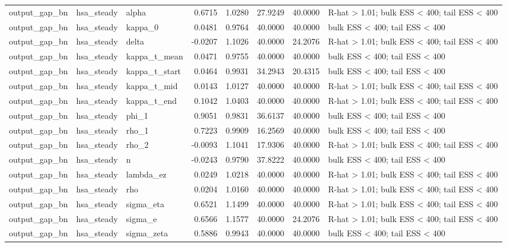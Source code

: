 \begin{tabular}{lllrrrrl}
output\_gap\_bn & hsa\_steady & alpha & 0.6715 & 1.0280 & 27.9249 & 40.0000 & R-hat > 1.01; bulk ESS < 400; tail ESS < 400 \\
output\_gap\_bn & hsa\_steady & kappa\_0 & 0.0481 & 0.9764 & 40.0000 & 40.0000 & bulk ESS < 400; tail ESS < 400 \\
output\_gap\_bn & hsa\_steady & delta & -0.0207 & 1.1026 & 40.0000 & 24.2076 & R-hat > 1.01; bulk ESS < 400; tail ESS < 400 \\
output\_gap\_bn & hsa\_steady & kappa\_t\_mean & 0.0471 & 0.9755 & 40.0000 & 40.0000 & bulk ESS < 400; tail ESS < 400 \\
output\_gap\_bn & hsa\_steady & kappa\_t\_start & 0.0464 & 0.9931 & 34.2943 & 20.4315 & bulk ESS < 400; tail ESS < 400 \\
output\_gap\_bn & hsa\_steady & kappa\_t\_mid & 0.0143 & 1.0127 & 40.0000 & 40.0000 & R-hat > 1.01; bulk ESS < 400; tail ESS < 400 \\
output\_gap\_bn & hsa\_steady & kappa\_t\_end & 0.1042 & 1.0403 & 40.0000 & 40.0000 & R-hat > 1.01; bulk ESS < 400; tail ESS < 400 \\
output\_gap\_bn & hsa\_steady & phi\_1 & 0.9051 & 0.9831 & 36.6137 & 40.0000 & bulk ESS < 400; tail ESS < 400 \\
output\_gap\_bn & hsa\_steady & rho\_1 & 0.7223 & 0.9909 & 16.2569 & 40.0000 & bulk ESS < 400; tail ESS < 400 \\
output\_gap\_bn & hsa\_steady & rho\_2 & -0.0093 & 1.1041 & 17.9306 & 40.0000 & R-hat > 1.01; bulk ESS < 400; tail ESS < 400 \\
output\_gap\_bn & hsa\_steady & n & -0.0243 & 0.9790 & 37.8222 & 40.0000 & bulk ESS < 400; tail ESS < 400 \\
output\_gap\_bn & hsa\_steady & lambda\_ez & 0.0249 & 1.0218 & 40.0000 & 40.0000 & R-hat > 1.01; bulk ESS < 400; tail ESS < 400 \\
output\_gap\_bn & hsa\_steady & rho & 0.0204 & 1.0160 & 40.0000 & 40.0000 & R-hat > 1.01; bulk ESS < 400; tail ESS < 400 \\
output\_gap\_bn & hsa\_steady & sigma\_eta & 0.6521 & 1.1499 & 40.0000 & 40.0000 & R-hat > 1.01; bulk ESS < 400; tail ESS < 400 \\
output\_gap\_bn & hsa\_steady & sigma\_e & 0.6566 & 1.1577 & 40.0000 & 24.2076 & R-hat > 1.01; bulk ESS < 400; tail ESS < 400 \\
output\_gap\_bn & hsa\_steady & sigma\_zeta & 0.5886 & 0.9943 & 40.0000 & 40.0000 & bulk ESS < 400; tail ESS < 400 \\

\end{tabular}

